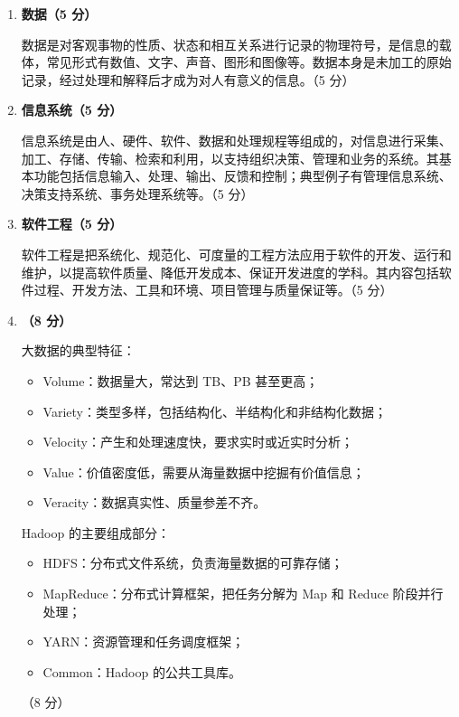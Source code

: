 \documentclass[a4paper,11pt]{article}
\begin{document}

\begin{enumerate}[start=29, label=\textbf{\arabic*.}, leftmargin=2.4em, itemsep=0.55em]

\item \textbf{数据（5 分）}

数据是对客观事物的性质、状态和相互关系进行记录的物理符号，是信息的载体，常见形式有数值、文字、声音、图形和图像等。数据本身是未加工的原始记录，经过处理和解释后才成为对人有意义的信息。\hfill（5 分）

\item \textbf{信息系统（5 分）}

信息系统是由人、硬件、软件、数据和处理规程等组成的，对信息进行采集、加工、存储、传输、检索和利用，以支持组织决策、管理和业务的系统。其基本功能包括信息输入、处理、输出、反馈和控制；典型例子有管理信息系统、决策支持系统、事务处理系统等。\hfill（5 分）

\item \textbf{软件工程（5 分）}

软件工程是把系统化、规范化、可度量的工程方法应用于软件的开发、运行和维护，以提高软件质量、降低开发成本、保证开发进度的学科。其内容包括软件过程、开发方法、工具和环境、项目管理与质量保证等。\hfill（5 分）

\item \textbf{（8 分）}

大数据的典型特征：
\begin{itemize}[leftmargin=1.8em, itemsep=1pt]
  \item Volume：数据量大，常达到 TB、PB 甚至更高；
  \item Variety：类型多样，包括结构化、半结构化和非结构化数据；
  \item Velocity：产生和处理速度快，要求实时或近实时分析；
  \item Value：价值密度低，需要从海量数据中挖掘有价值信息；
  \item Veracity：数据真实性、质量参差不齐。
\end{itemize}
Hadoop 的主要组成部分：
\begin{itemize}[leftmargin=1.8em, itemsep=1pt]
  \item HDFS：分布式文件系统，负责海量数据的可靠存储；
  \item MapReduce：分布式计算框架，把任务分解为 Map 和 Reduce 阶段并行处理；
  \item YARN：资源管理和任务调度框架；
  \item Common：Hadoop 的公共工具库。
\end{itemize}
\hfill（8 分）


\end{enumerate}
\end{document}
